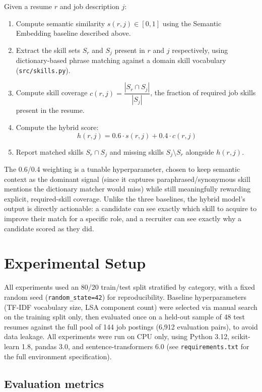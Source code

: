 \documentclass[conference]{IEEEtran}
\begin{document}
Given a resume $r$ and job description $j$:

\begin{enumerate}
\item Compute semantic similarity $s(r,j) \in [0,1]$ using the Semantic Embedding baseline described above.
\item Extract the skill sets $S_r$ and $S_j$ present in $r$ and $j$ respectively, using dictionary-based phrase matching against a domain skill vocabulary (\texttt{src/skills.py}).
\item Compute skill coverage $c(r,j) = \dfrac{|S_r \cap S_j|}{|S_j|}$, the fraction of required job skills present in the resume.
\item Compute the hybrid score:
\begin{equation}
h(r,j) = 0.6 \cdot s(r,j) + 0.4 \cdot c(r,j)
\end{equation}
\item Report matched skills $S_r \cap S_j$ and missing skills $S_j \setminus S_r$ alongside $h(r,j)$.
\end{enumerate}

The 0.6/0.4 weighting is a tunable hyperparameter, chosen to keep semantic context as the dominant signal (since it captures paraphrased/synonymous skill mentions the dictionary matcher would miss) while still meaningfully rewarding explicit, required-skill coverage. Unlike the three baselines, the hybrid model's output is directly actionable: a candidate can see exactly which skill to acquire to improve their match for a specific role, and a recruiter can see exactly why a candidate scored as they did.

\section{Experimental Setup}

All experiments used an 80/20 train/test split stratified by category, with a fixed random seed (\texttt{random\_state=42}) for reproducibility. Baseline hyperparameters (TF-IDF vocabulary size, LSA component count) were selected via manual search on the training split only, then evaluated once on a held-out sample of 48 test resumes against the full pool of 144 job postings (6,912 evaluation pairs), to avoid data leakage. All experiments were run on CPU only, using Python 3.12, scikit-learn 1.8, pandas 3.0, and sentence-transformers 6.0 (see \texttt{requirements.txt} for the full environment specification).

\subsection{Evaluation metrics}
\end{document}
